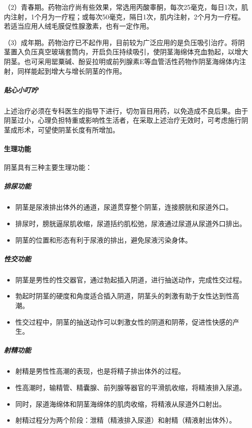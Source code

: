 （2）青春期。药物治疗尚有些效果，常选用丙酸睾酮，每次25毫克，每日1次，肌内注射，1个月为一疗程；或每次50毫克，隔日1次，肌内注射，2个月为一疗程。若适当应用人绒毛膜促性腺激素，也有一定作用。

（3）成年期。药物治疗已不起作用，目前较为广泛应用的是负压吸引治疗。将阴茎置入负压真空玻璃套筒内，开启负压持续吸引，使阴茎海绵体充血勃起，以增大阴茎。也可采用罂粟碱、酚妥拉明或前列腺素E等血管活性药物作阴茎海绵体内注射，同样能起到增大与增长阴茎的作用。

\subparagraph{贴心小叮咛}

上述治疗必须在专科医生的指导下进行，切勿盲目用药，以免造成不良后果。由于阴茎过小，心理负担特重或影响性生活者，在采取上述治疗无效时，可考虑施行阴茎成形术，可望使阴茎长度有所增加。

\paragraph{生理功能}

阴茎具有三种主要生理功能：

\subparagraph{排尿功能}
\begin{itemize}
\item 阴茎是尿液排出体外的通道，尿道贯穿整个阴茎，连接膀胱和尿道外口。
\item 排尿时，膀胱逼尿肌收缩，尿道括约肌松弛，尿液通过尿道从尿道外口排出。
\item 阴茎的位置和形态有利于尿液的排出，避免尿液污染身体。
\end{itemize}

\subparagraph{性交功能}
\begin{itemize}
\item 阴茎是男性的性交器官，通过勃起插入阴道，进行抽送动作，完成性交过程。
\item 勃起时阴茎的硬度和角度适合插入阴道，阴茎头的刺激有助于女性达到性高潮。
\item 性交过程中，阴茎的抽送动作可以刺激女性的阴道和阴蒂，促进性快感的产生。
\end{itemize}

\subparagraph{射精功能}
\begin{itemize}
\item 射精是男性性高潮的表现，也是将精子排出体外的过程。
\item 性高潮时，输精管、精囊腺、前列腺等器官的平滑肌收缩，将精液排入尿道。
\item 同时，尿道海绵体和阴茎海绵体的肌肉收缩，将精液从尿道外口射出。
\item 射精过程分为两个阶段：泄精（精液排入尿道）和射精（精液射出体外）。
\end{itemize}

